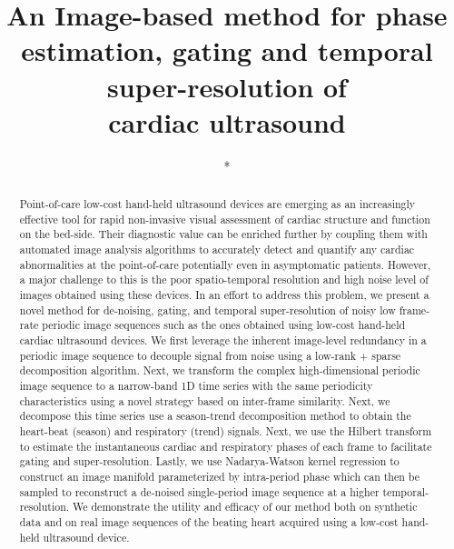 \documentclass[runningheads,a4paper]{llncs}
\begin{document}
\mainmatter  %

\title{An Image-based method for phase estimation, gating and temporal super-resolution of \\cardiac ultrasound}


%
%

\author{*}
\authorrunning{*}   
\tocauthor{*}
\institute{*}

\maketitle

\begin{abstract}
Point-of-care low-cost hand-held ultrasound devices are emerging as an increasingly effective tool for rapid non-invasive visual assessment of cardiac structure and function on the bed-side. Their diagnostic value can be enriched further by coupling them with automated image analysis algorithms to accurately detect and quantify any cardiac abnormalities at the point-of-care potentially even in asymptomatic patients. However, a major challenge to this is the poor spatio-temporal resolution and high noise level of images obtained using these devices. In an effort to address this problem, we present a novel method for de-noising, gating, and temporal super-resolution of noisy low frame-rate periodic image sequences such as the ones obtained using low-cost hand-held cardiac ultrasound devices. We first leverage the inherent image-level redundancy in a periodic image sequence to decouple signal from noise using a low-rank + sparse decomposition algorithm. Next, we transform the complex high-dimensional periodic image sequence to a narrow-band 1D time series with the same periodicity characteristics using a novel strategy based on inter-frame similarity. Next, we decompose this time series use a season-trend decomposition method to obtain the heart-beat (season) and respiratory (trend) signals. Next, we use the Hilbert transform to estimate the instantaneous cardiac and respiratory phases of each frame to facilitate gating and super-resolution. Lastly, we use Nadarya-Watson kernel regression to construct an image manifold parameterized by intra-period phase which can then be sampled to reconstruct a de-noised single-period image sequence at a higher temporal-resolution. We demonstrate the utility and efficacy of our method both on synthetic data and on real image sequences of the beating heart acquired using a low-cost hand-held ultrasound device.
\end{abstract}
\end{document}
